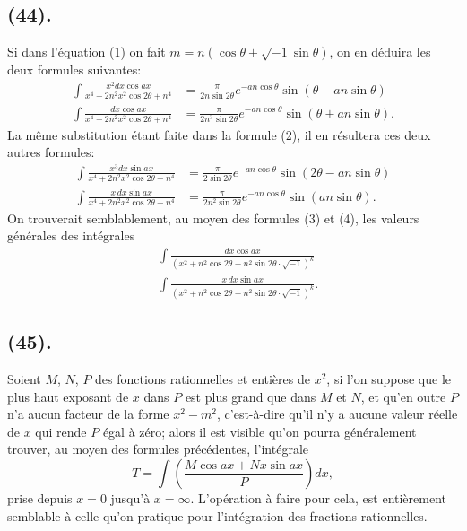 \documentclass{article}
\begin{document}
\subsection*{(44).}

Si dans l'équation (1) on fait $m=n(\cos\theta+\sqrt{-1}\sin\theta)$, on en déduira les deux formules suivantes:
\[ \begin{aligned} \int\frac{x^{2}dx\cos ax}{x^{4}+2n^{2}x^{2}\cos2\theta+n^{4}}&=\frac{\pi}{2n\sin2\theta}e^{-an\cos\theta}\sin(\theta-an\sin\theta)\\ \int\frac{dx\cos ax}{x^{4}+2n^{2}x^{2}\cos2\theta+n^{4}}&=\frac{\pi}{2n^{3}\sin2\theta}e^{-an\cos\theta}\sin(\theta+an\sin\theta). \end{aligned} \tag{5} \]
La même substitution étant faite dans la formule (2), il en résultera ces deux autres formules:
\[ \begin{aligned} \int\frac{x^{3}dx\sin ax}{x^{4}+2n^{2}x^{2}\cos2\theta+n^{4}}&=\frac{\pi}{2\sin2\theta}e^{-an\cos\theta}\sin(2\theta-an\sin\theta)\\ \int\frac{x\,dx\sin ax}{x^{4}+2n^{2}x^{2}\cos2\theta+n^{4}}&=\frac{\pi}{2n^{2}\sin2\theta}e^{-an\cos\theta}\sin(an\sin\theta). \end{aligned} \tag{6} \]
On trouverait semblablement, au moyen des formules (3) et (4), les valeurs générales des intégrales
\[ \begin{aligned} &\int\frac{dx\cos ax}{(x^{2}+n^{2}\cos2\theta+n^{2}\sin2\theta\cdot\sqrt{-1})^{k}}\\ &\int\frac{x\,dx\sin ax}{(x^{2}+n^{2}\cos2\theta+n^{2}\sin2\theta\cdot\sqrt{-1})^{k}}. \end{aligned} \tag{7} \]


\subsection*{(45).}

Soient $M$, $N$, $P$ des fonctions rationnelles et entières de $x^{2}$, si l'on suppose que le plus haut exposant de $x$ dans $P$ est plus grand que dans $M$ et $N$, et qu'en outre $P$ n'a aucun facteur de la forme $x^{2}-m^{2}$, c'est-à-dire qu'il n'y a aucune valeur réelle de $x$ qui rende $P$ égal à zéro; alors il est visible qu'on pourra généralement trouver, au moyen des formules précédentes, l'intégrale
\[ T=\int\left(\frac{M\cos ax+Nx\sin ax}{P}\right)dx, \tag{8} \]
prise depuis $x=0$ jusqu'à $x=\infty$. L'opération à faire pour cela, est entièrement semblable à celle qu'on pratique pour l'intégration des fractions rationnelles.
\end{document}
